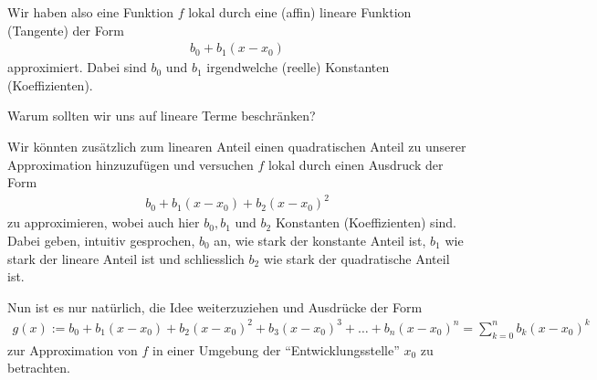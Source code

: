 Wir haben also eine Funktion $f$ lokal durch eine (affin) lineare Funktion (Tangente) der Form
\begin{align*}
  b_0 + b_1(x-x_0)
\end{align*}
approximiert. Dabei sind $b_0$ und $b_1$ irgendwelche (reelle) Konstanten (Koeffizienten). 

\begin{myidea}
  Warum sollten wir uns auf lineare Terme beschränken?
\end{myidea}

Wir könnten zusätzlich zum linearen Anteil einen quadratischen Anteil zu unserer Approximation hinzuzufügen und versuchen $f$ lokal durch einen Ausdruck der Form
\begin{align*}
  b_0 + b_1(x-x_0) + b_2(x-x_0)^2
\end{align*}
zu approximieren, wobei auch hier $b_0, b_1$ und $b_2$ Konstanten (Koeffizienten) sind. Dabei geben, intuitiv gesprochen, $b_0$ an, wie stark der konstante Anteil ist, $b_1$ wie stark der lineare Anteil ist und schliesslich $b_2$ wie stark der quadratische Anteil ist.   

Nun ist es nur natürlich, die Idee weiterzuziehen und Ausdrücke der Form
\begin{align*}
  g(x) := b_0 + b_1(x-x_0) + b_2(x-x_0)^2 + b_3(x-x_0)^3 + \ldots + b_n(x-x_0)^n = \sum_{k=0}^n b_k(x-x_0)^k
\end{align*}
zur Approximation von $f$ in einer Umgebung der \enquote{Entwicklungsstelle} $x_0$ zu betrachten.

